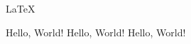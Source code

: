 \documentclass[10pt]{book}
\begin{document}

\LaTeX

Hello, World!
Hello, World!
Hello, World!

\cite{Nobody06}

% 
% 
% 
% 
% 
% 



\end{document}
